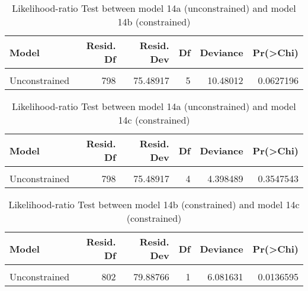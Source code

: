 \documentclass[
]{article}
\begin{document}
\begin{table}[!h]

\caption{\label{tab:unnamed-chunk-54}Likelihood-ratio Test between model 14a (unconstrained) and model 14b (constrained) \label{table:lrtest_2_ee}}
\centering
\begin{tabular}[t]{l|r|r|r|r|r}
\hline
Model & Resid. Df & Resid. Dev & Df & Deviance & Pr(>Chi)\\
\hline
\cellcolor{gray!6}{Constrained} & \cellcolor{gray!6}{803} & \cellcolor{gray!6}{85.96929} & \cellcolor{gray!6}{} & \cellcolor{gray!6}{} & \cellcolor{gray!6}{}\\
\hline
Unconstrained & 798 & 75.48917 & 5 & 10.48012 & 0.0627196\\
\hline
\end{tabular}
\end{table}

\begin{table}[!h]

\caption{\label{tab:unnamed-chunk-55}Likelihood-ratio Test between model 14a (unconstrained) and model 14c (constrained) \label{table:lrtest_3_ee}}
\centering
\begin{tabular}[t]{l|r|r|r|r|r}
\hline
Model & Resid. Df & Resid. Dev & Df & Deviance & Pr(>Chi)\\
\hline
\cellcolor{gray!6}{Constrained} & \cellcolor{gray!6}{802} & \cellcolor{gray!6}{79.88766} & \cellcolor{gray!6}{} & \cellcolor{gray!6}{} & \cellcolor{gray!6}{}\\
\hline
Unconstrained & 798 & 75.48917 & 4 & 4.398489 & 0.3547543\\
\hline
\end{tabular}
\end{table}

\begin{table}[!h]

\caption{\label{tab:unnamed-chunk-56}Likelihood-ratio Test between model 14b (constrained) and model 14c (constrained) \label{table:lrtest_4_ee}}
\centering
\begin{tabular}[t]{l|r|r|r|r|r}
\hline
Model & Resid. Df & Resid. Dev & Df & Deviance & Pr(>Chi)\\
\hline
\cellcolor{gray!6}{Constrained} & \cellcolor{gray!6}{803} & \cellcolor{gray!6}{85.96929} & \cellcolor{gray!6}{} & \cellcolor{gray!6}{} & \cellcolor{gray!6}{}\\
\hline
Unconstrained & 802 & 79.88766 & 1 & 6.081631 & 0.0136595\\
\hline
\end{tabular}
\end{table}
\end{document}
